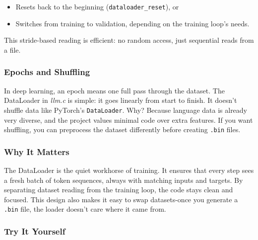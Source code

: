 \documentclass[
  letterpaper,
  DIV=11,
  numbers=noendperiod]{scrreprt}
\providecommand{\tightlist}{%
  \setlength{\itemsep}{0pt}\setlength{\parskip}{0pt}}
\begin{document}
\begin{itemize}
\tightlist
\item
  Resets back to the beginning (\texttt{dataloader\_reset}), or
\item
  Switches from training to validation, depending on the training loop's
  needs.
\end{itemize}

This stride-based reading is efficient: no random access, just
sequential reads from a file.

\subsubsection{Epochs and Shuffling}\label{epochs-and-shuffling}

In deep learning, an epoch means one full pass through the dataset. The
DataLoader in \emph{llm.c} is simple: it goes linearly from start to
finish. It doesn't shuffle data like PyTorch's \texttt{DataLoader}. Why?
Because language data is already very diverse, and the project values
minimal code over extra features. If you want shuffling, you can
preprocess the dataset differently before creating \texttt{.bin} files.

\subsubsection{Why It Matters}\label{why-it-matters-3}

The DataLoader is the quiet workhorse of training. It ensures that every
step sees a fresh batch of token sequences, always with matching inputs
and targets. By separating dataset reading from the training loop, the
code stays clean and focused. This design also makes it easy to swap
datasets-once you generate a \texttt{.bin} file, the loader doesn't care
where it came from.

\subsubsection{Try It Yourself}\label{try-it-yourself-3}
\end{document}

